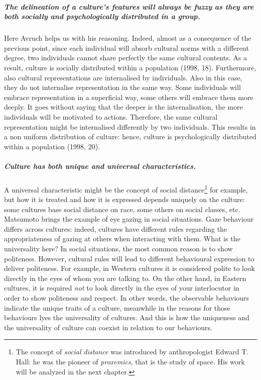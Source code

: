 \documentclass[../main.tex]{subfiles}
\begin{document}
\subparagraph*{The delineation of a culture's features will always be fuzzy as they are both socially and psychologically distributed in a group.} Here Avruch helps us with his reasoning. Indeed, almost as a consequence of the previous point, since each individual will absorb cultural norms with a different degree, two individuals cannot share perfectly the same cultural contents. As a result, culture is socially distributed within a population (1998, 18). Furthermore, also cultural representations are internalised by individuals. Also in this case, they do not internalise representation in the same way. Some individuals will embrace representation in a superficial way, some others will embrace them more deeply. It goes without saying that the deeper is the internalisation, the more individuals will be motivated to actions. Therefore, the same cultural representation might be internalised differently by two individuals. This results in a non uniform distribution of culture: hence, culture is psychologically distributed within a population (1998, 20).

\subparagraph*{Culture has both unique and universal characteristics.} A universal characteristic might be the concept of social distance\footnote{The concept of \textit{social distance} was introduced by anthropologist Edward T. Hall: he was the pioneer of \textit{proxemics}, that is the study of space. His work will be analyzed in the next chapter.} for example, but how it is treated and how it is expressed depends uniquely on the culture: some cultures base social distance on race, some others on social classes, etc. Matsumoto brings the example of eye gazing in social situations. Gaze behaviour differs across cultures: indeed, cultures have different rules regarding the appropriateness of gazing at others when interacting with them. What is the universality here? In social situations, the most common reason is to show politeness. However, cultural rules will lead to different behavioural expression to deliver politeness. For example, in Western cultures it is considered polite to look directly in the eyes of whom you are talking to. On the other hand, in Eastern cultures, it is required \textit{not} to look directly in the eyes of your interlocutor in order to show politeness and respect. In other words, the observable behaviours indicate the unique traits of a culture, meanwhile in the reasons for those behaviours lyes the universality of cultures. And this is how the uniqueness and the universality of culture can coexist in relation to our behaviours.
\end{document}

